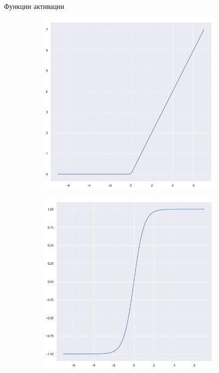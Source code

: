 \documentclass[aspectratio=169]{beamer}
\begin{document}
\begin{frame}{Функции активации}
\begin{figure}
\begin{subfigure}[b]{.32\linewidth}
            \centering
            \includegraphics[width=\linewidth]{graphs/fig12.png}
        \end{subfigure}
        \begin{subfigure}[b]{.32\linewidth}
            \centering
            \includegraphics[width=\linewidth]{graphs/fig13.png}
        \end{subfigure}
    \end{figure}
\end{frame}
\end{document}
